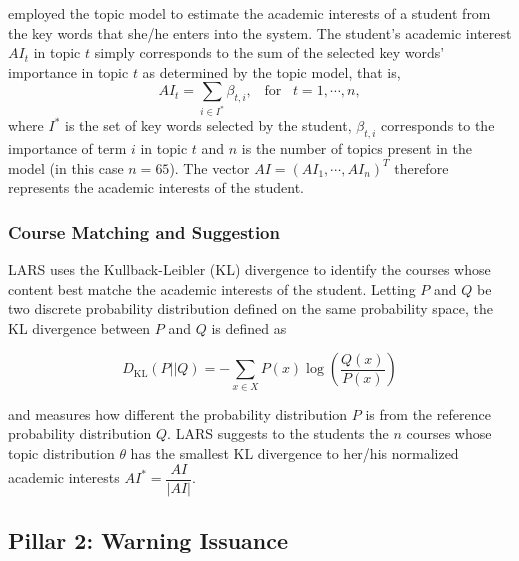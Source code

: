 \documentclass[pmlr]{jmlr}%
\begin{document}
\citet{Morsomme.2019} employed the topic model to estimate the academic interests of a student from the key words that she/he enters into the system. The student's academic interest $AI_t$ in topic $t$ simply corresponds to the sum of the selected key words' importance in topic $t$ as determined by the topic model, that is,
$$ AI_t = \sum_{i \in I^*} \beta_{t,i}, \;\;\;  \mbox{for} \;\;\;  t=1, \cdots, n,$$
where $I^*$ is the set of key words selected by the student, $\beta_{t,i}$ corresponds to the importance of term $i$ in topic $t$ and $n$ is the number of topics present in the model (in this case $n=65$). The vector $AI = (AI_1, \cdots, AI_{n})^T$ therefore represents the academic interests of the student.

\subsubsection{Course Matching and Suggestion}

LARS uses the Kullback-Leibler (KL) divergence \citep{Kullback.1951} to identify the courses whose content best matche the academic interests of the student.
Letting $P$ and $Q$ be two discrete probability distribution defined on the same probability space, the KL divergence between $P$ and $Q$ is defined as

$$ D_{\mathrm{KL}} \left( P || Q \right) =  - \sum_{x \in X} P(x) \log\left(\dfrac{Q(x)}{P(x)}\right)$$

\noindent and measures how different the probability distribution $P$ is from the reference probability distribution $Q$.
LARS suggests to the students the $n$ courses whose topic distribution $\theta$ has the smallest KL divergence to her/his normalized academic interests $AI^* = \dfrac{AI}{\lvert AI \rvert}$.

\subsection{Pillar 2: Warning Issuance}
\end{document}
